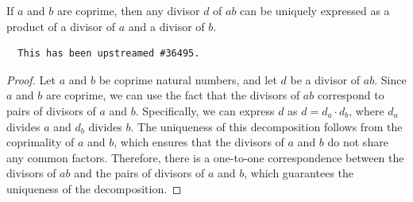 \begin{theorem}
\label{unique_divisor_decomposition}
\leanok
If $a$ and $b$ are coprime, then any divisor $d$ of $ab$ can be uniquely expressed as a product of a divisor of $a$ and a divisor of $b$.
    \begin{verbatim}
  This has been upstreamed #36495.
  \end{verbatim}
\end{theorem}
\begin{proof}
Let $a$ and $b$ be coprime natural numbers, and let $d$ be a divisor of $ab$. Since $a$ and $b$ are coprime, we can use the fact that the divisors of $ab$ correspond to pairs of divisors of $a$ and $b$. Specifically, we can express $d$ as $d = d_a \cdot d_b$, where $d_a$ divides $a$ and $d_b$ divides $b$. The uniqueness of this decomposition follows from the coprimality of $a$ and $b$, which ensures that the divisors of $a$ and $b$ do not share any common factors. Therefore, there is a one-to-one correspondence between the divisors of $ab$ and the pairs of divisors of $a$ and $b$, which guarantees the uniqueness of the decomposition.
\end{proof}
